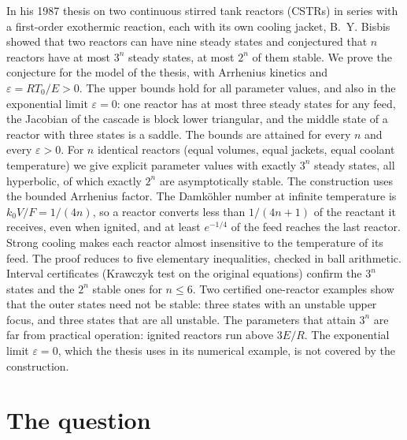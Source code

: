 \documentclass[11pt,a4paper]{report}
\newcommand*{\eps}{\varepsilon}
\begin{document}
\makepapertitle

\begin{paperabstract}
In his 1987 thesis on two continuous stirred tank reactors (CSTRs) in series with a first-order exothermic
reaction, each with its own cooling jacket, B.~Y. Bisbis showed that two reactors can have nine steady states and
conjectured that \(n\) reactors have at most \(3^n\) steady states, at most \(2^n\) of them stable. We prove the
conjecture for the model of the thesis, with Arrhenius kinetics and \(\eps=RT_0/E>0\). The upper bounds hold for all
parameter values, and also in the exponential limit \(\eps=0\): one reactor has at most three steady states for any
feed, the Jacobian of the cascade is block lower triangular, and the middle state of a reactor with three states is a
saddle. The bounds are attained for every \(n\) and every \(\eps>0\). For \(n\) identical reactors (equal volumes, equal
jackets, equal coolant temperature) we give explicit parameter values with exactly \(3^n\) steady states, all
hyperbolic, of which exactly \(2^n\) are asymptotically stable. The construction uses the bounded Arrhenius factor.
The Damköhler number at infinite temperature is \(k_0V/F=1/(4n)\), so a reactor converts less than \(1/(4n+1)\) of
the reactant it receives, even when ignited, and at least \(e^{-1/4}\) of the feed reaches the last reactor. Strong
cooling makes each reactor almost insensitive to the temperature of its feed. The proof reduces to five
elementary inequalities, checked in ball arithmetic. Interval certificates (Krawczyk test on the original equations)
confirm the \(3^n\) states and the \(2^n\) stable ones for \(n\le 6\). Two certified one-reactor examples show that the
outer states need not be stable: three states with an unstable upper focus, and three states that are all unstable.
The parameters that attain \(3^n\) are far from practical operation: ignited reactors run above \(3E/R\). The
exponential limit \(\eps=0\), which the thesis uses in its numerical example, is not covered by the construction.
\end{paperabstract}

\section*{The question}
\end{document}
